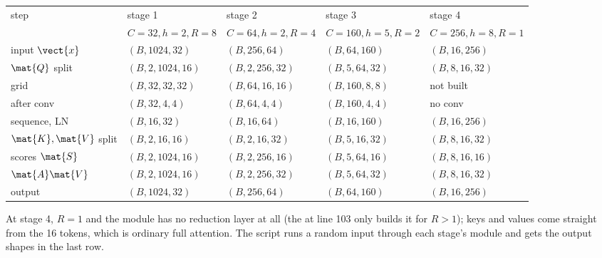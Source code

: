 \begin{center}
\small
\setlength{\tabcolsep}{4pt}
\begin{tabular}{lllll}
\toprule
step & stage 1 & stage 2 & stage 3 & stage 4\\
 & $C{=}32, h{=}2, R{=}8$ & $C{=}64, h{=}2, R{=}4$ & $C{=}160, h{=}5, R{=}2$ & $C{=}256, h{=}8, R{=}1$\\
\midrule
input $\vect{x}$ & $(B, 1024, 32)$ & $(B, 256, 64)$ & $(B, 64, 160)$ & $(B, 16, 256)$\\
$\mat{Q}$ split & $(B, 2, 1024, 16)$ & $(B, 2, 256, 32)$ & $(B, 5, 64, 32)$ & $(B, 8, 16, 32)$\\
grid & $(B, 32, 32, 32)$ & $(B, 64, 16, 16)$ & $(B, 160, 8, 8)$ & not built\\
after conv & $(B, 32, 4, 4)$ & $(B, 64, 4, 4)$ & $(B, 160, 4, 4)$ & no conv\\
sequence, LN & $(B, 16, 32)$ & $(B, 16, 64)$ & $(B, 16, 160)$ & $(B, 16, 256)$\\
$\mat{K}, \mat{V}$ split & $(B, 2, 16, 16)$ & $(B, 2, 16, 32)$ & $(B, 5, 16, 32)$ & $(B, 8, 16, 32)$\\
scores $\mat{S}$ & $(B, 2, 1024, 16)$ & $(B, 2, 256, 16)$ & $(B, 5, 64, 16)$ & $(B, 8, 16, 16)$\\
$\mat{A}\mat{V}$ & $(B, 2, 1024, 16)$ & $(B, 2, 256, 32)$ & $(B, 5, 64, 32)$ & $(B, 8, 16, 32)$\\
output & $(B, 1024, 32)$ & $(B, 256, 64)$ & $(B, 64, 160)$ & $(B, 16, 256)$\\
\bottomrule
\end{tabular}
\end{center}
At stage 4, $R = 1$ and the module has no reduction layer at all (the  at line 103 only
builds it for $R > 1$); keys and values come straight from the 16 tokens, which is ordinary full
attention. The script runs a random input through each stage's module and gets the output shapes
in the last row\tagC.

